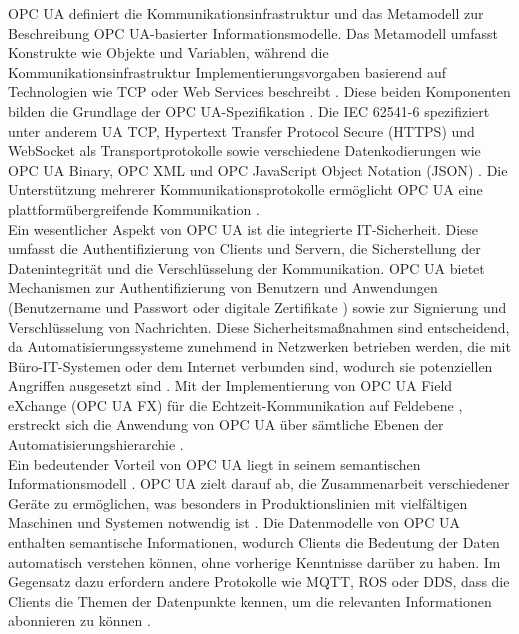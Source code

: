 OPC UA definiert die Kommunikationsinfrastruktur und das Metamodell zur Beschreibung OPC UA-basierter Informationsmodelle. Das Metamodell umfasst Konstrukte wie Objekte und Variablen, während die Kommunikationsinfrastruktur Implementierungsvorgaben basierend auf Technologien wie TCP oder Web Services beschreibt \cite{dkedeutschekommissionelektrotechnikelektronikinformationstechnikindinundvdeOPCUnifiedArchitecture2021a, ensteOPCUnifiedArchitecture2011}. Diese beiden Komponenten bilden die Grundlage der OPC UA-Spezifikation \cite{ensteOPCUnifiedArchitecture2011}. Die IEC 62541-6 \textcite{dkedeutschekommissionelektrotechnikelektronikinformationstechnikindinundvdeOPCUnifiedArchitecture2021a} spezifiziert unter anderem UA TCP, Hypertext Transfer Protocol Secure (HTTPS) und WebSocket als Transportprotokolle sowie verschiedene Datenkodierungen wie OPC UA Binary, OPC XML und OPC JavaScript Object Notation (JSON) \cite{dkedeutschekommissionelektrotechnikelektronikinformationstechnikindinundvdeOPCUnifiedArchitecture2021a}. Die Unterstützung mehrerer Kommunikationsprotokolle ermöglicht OPC UA eine plattformübergreifende Kommunikation \cite{profanterOPCUAROS2019}.\\

Ein wesentlicher Aspekt von OPC UA ist die integrierte IT-Sicherheit. Diese umfasst die Authentifizierung von Clients und Servern, die Sicherstellung der Datenintegrität und die Verschlüsselung der Kommunikation. OPC UA bietet Mechanismen zur Authentifizierung von Benutzern und Anwendungen (Benutzername und Passwort oder digitale Zertifikate \cite{profanterOPCUAROS2019}) sowie zur Signierung und Verschlüsselung von Nachrichten. Diese Sicherheitsmaßnahmen sind entscheidend, da Automatisierungssysteme zunehmend in Netzwerken betrieben werden, die mit Büro-IT-Systemen oder dem Internet verbunden sind, wodurch sie potenziellen Angriffen ausgesetzt sind \cite{ensteOPCUnifiedArchitecture2011} . Mit der Implementierung von OPC UA Field eXchange (OPC UA FX) für die Echtzeit-Kommunikation auf Feldebene \cite{UAFXPart80}, erstreckt sich die Anwendung von OPC UA über sämtliche Ebenen der Automatisierungshierarchie \cite{shilengeOptimizationOperationalInformation2022a}.\\

Ein bedeutender Vorteil von OPC UA liegt in seinem semantischen Informationsmodell \cite{profanterOPCUAROS2019, deveciThoroughAnalysisComparison2022}. OPC UA zielt darauf ab, die Zusammenarbeit verschiedener Geräte zu ermöglichen, was besonders in Produktionslinien mit vielfältigen Maschinen und Systemen notwendig ist \cite{profanterOPCUAROS2019}. Die Datenmodelle von OPC UA enthalten semantische Informationen, wodurch Clients die Bedeutung der Daten automatisch verstehen können, ohne vorherige Kenntnisse darüber zu haben. Im Gegensatz dazu erfordern andere Protokolle wie MQTT, ROS oder DDS, dass die Clients die Themen der Datenpunkte kennen, um die relevanten Informationen abonnieren zu können \cite{profanterOPCUAROS2019}.\\

